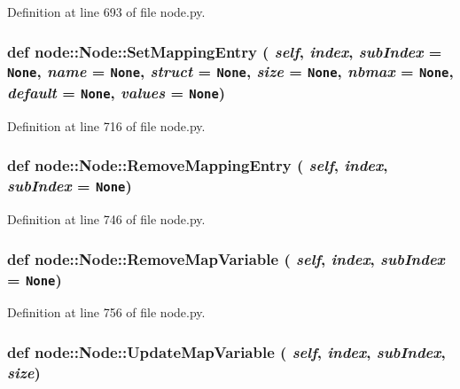 Definition at line 693 of file node.py.\hypertarget{classnode_1_1Node_3585c494cda4d7eb89361ccd8254c007}{
\subsubsection[SetMappingEntry]{\setlength{\rightskip}{0pt plus 5cm}def node::Node::Set\-Mapping\-Entry ( {\em self},  {\em index},  {\em sub\-Index} = {\tt None},  {\em name} = {\tt None},  {\em struct} = {\tt None},  {\em size} = {\tt None},  {\em nbmax} = {\tt None},  {\em default} = {\tt None},  {\em values} = {\tt None})}}
\label{classnode_1_1Node_3585c494cda4d7eb89361ccd8254c007}




Definition at line 716 of file node.py.\hypertarget{classnode_1_1Node_0caa56ee2a2847bde95a23a0312f3e03}{
\subsubsection[RemoveMappingEntry]{\setlength{\rightskip}{0pt plus 5cm}def node::Node::Remove\-Mapping\-Entry ( {\em self},  {\em index},  {\em sub\-Index} = {\tt None})}}
\label{classnode_1_1Node_0caa56ee2a2847bde95a23a0312f3e03}




Definition at line 746 of file node.py.\hypertarget{classnode_1_1Node_7495c84e9bacd05f5ae653c3a821cf1a}{
\subsubsection[RemoveMapVariable]{\setlength{\rightskip}{0pt plus 5cm}def node::Node::Remove\-Map\-Variable ( {\em self},  {\em index},  {\em sub\-Index} = {\tt None})}}
\label{classnode_1_1Node_7495c84e9bacd05f5ae653c3a821cf1a}




Definition at line 756 of file node.py.\hypertarget{classnode_1_1Node_bd89e1173902b1d4c303a6111723b910}{
\subsubsection[UpdateMapVariable]{\setlength{\rightskip}{0pt plus 5cm}def node::Node::Update\-Map\-Variable ( {\em self},  {\em index},  {\em sub\-Index},  {\em size})}}
\label{classnode_1_1Node_bd89e1173902b1d4c303a6111723b910}




